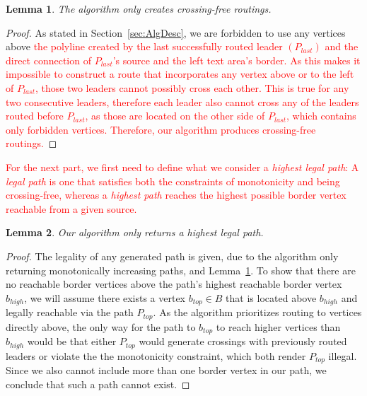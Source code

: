 \documentclass[11pt,a4paper]{vutinfth}
\newtheorem{lemma}{Lemma}
\newcommand{\change}[1]{\textcolor{red}{#1}}
\begin{document}
\begin{lemma}
	The algorithm only creates crossing-free routings.
	\label{lem:CrosFree}
\end{lemma}
\begin{proof}
	As stated in Section~\ref{sec:AlgDesc}, we are forbidden to use any vertices above \change{the polyline created by the last successfully routed leader $(P_{last})$ and the direct connection of $P_{last}$'s source and the left text area's border. As this makes it impossible to construct a route that incorporates any vertex above or to the left of $P_{last}$, those two leaders cannot possibly cross each other. This is true for any two consecutive leaders, therefore each leader also cannot cross any of the leaders routed before $P_{last}$, as those are located on the other side of $P_{last}$, which contains only forbidden vertices.
	Therefore, our algorithm produces crossing-free routings.}
\end{proof}

\change{For the next part, we first need to define what we consider a \emph{highest legal path}: A \emph{legal path} is one that satisfies both the constraints of monotonicity and being crossing-free, whereas a \emph{highest path} reaches the highest possible border vertex reachable from a given source.} 

\begin{lemma}
	Our algorithm only returns a highest legal path.
	\label{lem:High}
\end{lemma}
\begin{proof}
	The legality of any generated path is given, due to the algorithm only returning monotonically increasing paths, and Lemma~\ref{lem:CrosFree}. To show that there are no reachable border vertices above the path's highest reachable border vertex $b_{high}$, we will assume there exists a vertex $b_{top} \in B$ that is located above $b_{high}$ and legally reachable via the path $P_{top}$. As the algorithm prioritizes routing to vertices directly above, the only way for the path to $b_{top}$ to reach higher vertices than $b_{high}$ would be that either $P_{top}$ would generate crossings with previously routed leaders or violate the the monotonicity constraint, which both render $P_{top}$ illegal. Since we also cannot include more than one border vertex in our path, we conclude that such a path cannot exist.
\end{proof}
\end{document}
